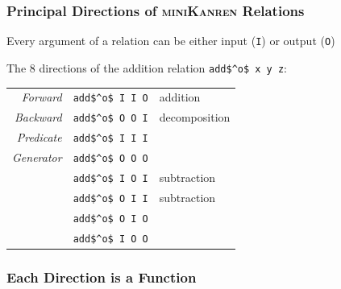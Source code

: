 \documentclass[xcolor=table, aspectratio=169]{beamer}
\newcommand{\mk}{\textsc{miniKanren}\xspace}
\begin{document}
\begin{frame}[fragile]
  \frametitle{Principal Directions of \mk Relations}
\begin{center}
  Every argument of a relation can be either input (\lstinline{I}) or output (\lstinline{O})
\end{center}

\vfill

\begin{center}
  The 8 directions of the addition relation \lstinline{add$^o$ x y z}:
\end{center}

\begin{center}
\begin{tabular}{rll}
  \emph{Forward}   & \lstinline|add$^o$ I I O| & addition      \\
  \emph{Backward}  & \lstinline|add$^o$ O O I| & decomposition \\
  \emph{Predicate} & \lstinline|add$^o$ I I I| &               \\
  \emph{Generator} & \lstinline|add$^o$ O O O| &               \\
                   & \lstinline|add$^o$ I O I| & subtraction   \\
                   & \lstinline|add$^o$ O I I| & subtraction   \\
                   & \lstinline|add$^o$ O I O| &               \\
                   & \lstinline|add$^o$ I O O| &
\end{tabular}
\end{center}
\end{frame}


\begin{frame}[fragile]
  \frametitle{Each Direction is a Function}
\end{frame}
\end{document}
